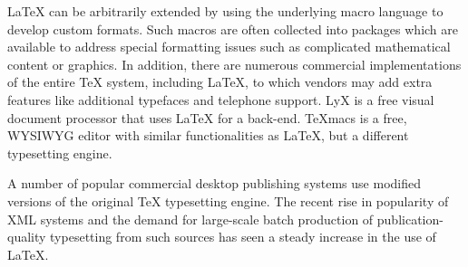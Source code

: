 LaTeX can be arbitrarily extended by using the underlying macro language to develop custom formats. Such macros are often collected into packages which are available to address special formatting issues such as complicated mathematical content or graphics. In addition, there are numerous commercial implementations of the entire TeX system, including LaTeX, to which vendors may add extra features like additional typefaces and telephone support. LyX is a free visual document processor that uses LaTeX for a back-end. TeXmacs is a free, WYSIWYG editor with similar functionalities as LaTeX, but a different typesetting engine.

A number of popular commercial desktop publishing systems use modified versions of the original TeX typesetting engine. The recent rise in popularity of XML systems and the demand for large-scale batch production of publication-quality typesetting from such sources has seen a steady increase in the use of LaTeX.

